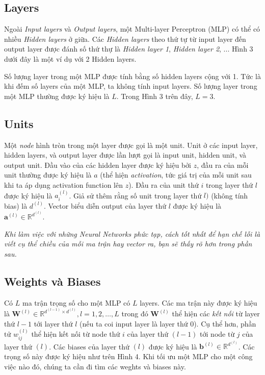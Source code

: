  
\subsection{Layers}
Ngoài \textit{Input layers} và \textit{Output layers}, một Multi-layer Perceptron (MLP) có thể có nhiều \textit{Hidden layers} ở giữa. Các \textit{Hidden layers} theo thứ tự từ input layer đến output layer được đánh số thứ thự là \textit{Hidden layer 1}, \textit{Hidden layer 2}, ... Hình 3 dưới đây là một ví dụ với 2 Hidden layers. 
 
 
 
Số lượng layer trong một MLP được tính bằng số hidden layers cộng với 1. Tức là khi đếm số layers của một MLP, ta không tính input layers. Số lượng layer trong một MLP thường được ký hiệu là $L$. Trong Hình 3 trên đây, $L = 3$. 
 
 
\subsection{Units}
Một \textit{node} hình tròn trong một layer được gọi là một unit. Unit ở các input layer, hidden layers, và output layer được lần lượt gọi là input unit, hidden unit, và output unit. Đầu vào của các hidden layer được ký hiệu bởi $z$, đầu ra của mỗi unit thường được ký hiệu là $a$ (thể hiện \textit{activation}, tức giá trị của mỗi unit sau khi ta áp dụng activation function lên $z$). Đầu ra của unit thứ $i$ trong layer thứ $l$ được ký hiệu là $a_i^{(l)}$. Giả sử thêm rằng số unit trong layer thứ $l)$ (không tính bias) là $d^{(l)}$. Vector biểu diễn output của layer thứ $l$ được ký hiệu là $\mathbf{a}^{(l)} \in \mathbb{R}^{d^{(l)}}$. 
 
\textit{Khi làm việc với những Neural Networks phức tạp, cách tốt nhất để hạn chế lỗi là viết cụ thể chiều của mỗi ma trận hay vector ra, bạn sẽ thấy rõ hơn trong phần sau.} 
 
 
 
 
\subsection{Weights và Biases}
Có $L$ ma trận trọng số cho một MLP có $L$ layers. Các ma trận này được ký hiệu là $\mathbf{W}^{(l)} \in \mathbb{R}^{d^{(l-1)}\times d^{(l)}}, l = 1, 2, \dots, L$ trong đó $\mathbf{W}^{(l)}$ thể hiện các \textit{kết nối} từ layer thứ $l-1$ tới layer thứ $l$ (nếu ta coi input layer là layer thứ $0$). Cụ thể hơn, phần tử $w^{(l)}_{ij}$ thể hiện kết nối từ node thứ $i$ của layer thứ $(l-1)$ tới node từ $j$ của layer thứ $(l)$. Các biases của layer thứ $(l)$ được ký hiệu là $\mathbf{b}^{(l)} \in \mathbb{R}^{d^{(l)}}$. Các trọng số này được ký hiệu như trên Hình 4. Khi tối ưu một MLP cho một công việc nào đó, chúng ta cần đi tìm các weghts và biases này. 
 
